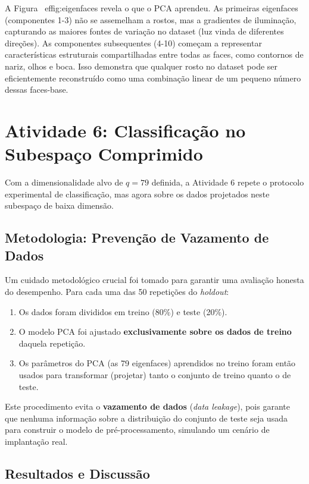 \documentclass[a4paper,12pt]{article}
\begin{document}
A Figura~
ef{fig:eigenfaces} revela o que o PCA aprendeu. As primeiras eigenfaces (componentes 1-3) não se assemelham a rostos, mas a gradientes de iluminação, capturando as maiores fontes de variação no dataset (luz vinda de diferentes direções). As componentes subsequentes (4-10) começam a representar características estruturais compartilhadas entre todas as faces, como contornos de nariz, olhos e boca. Isso demonstra que qualquer rosto no dataset pode ser eficientemente reconstruído como uma combinação linear de um pequeno número dessas faces-base.

\section{Atividade 6: Classificação no Subespaço Comprimido}

Com a dimensionalidade alvo de \(q=79\) definida, a Atividade 6 repete o protocolo experimental de classificação, mas agora sobre os dados projetados neste subespaço de baixa dimensão.

\subsection{Metodologia: Prevenção de Vazamento de Dados}

Um cuidado metodológico crucial foi tomado para garantir uma avaliação honesta do desempenho. Para cada uma das 50 repetições do \emph{holdout}:
\begin{enumerate}
    \item Os dados foram divididos em treino (80\%) e teste (20\%).
    \item O modelo PCA foi ajustado \textbf{exclusivamente sobre os dados de treino} daquela repetição.
    \item Os parâmetros do PCA (as 79 eigenfaces) aprendidos no treino foram então usados para transformar (projetar) tanto o conjunto de treino quanto o de teste.
\end{enumerate}
Este procedimento evita o \textbf{vazamento de dados} (\emph{data leakage}), pois garante que nenhuma informação sobre a distribuição do conjunto de teste seja usada para construir o modelo de pré-processamento, simulando um cenário de implantação real.

\subsection{Resultados e Discussão}
\end{document}
